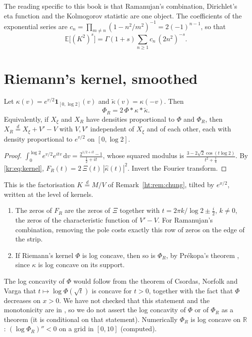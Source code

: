 The reading specific to this book is that Ramanujan's combination, Dirichlet's eta function and the Kolmogorov statistic are one object. The coefficients of the exponential series are $c_n=\prod_{m\ne n}(1-n^2/m^2)^{-1}=2(-1)^{n-1}$, so that
\[
\mathbb E\big[(K^2)^{s}\big]=\Gamma(1+s)\sum_{n\ge1}c_n\,(2n^2)^{-s}.
\]

\section{Riemann's kernel, smoothed}\label{kr:sec:smooth}
\begin{theorem}\label{kr:thm:conv}
Let $\kappa(v)=e^{v/2}\mathbf 1_{[0,\log2]}(v)$ and $\tilde\kappa(v)=\kappa(-v)$. Then
\[
\Phi_R=2\,\Phi*\kappa*\tilde\kappa .
\]
Equivalently, if $X_\xi$ and $X_R$ have densities proportional to $\Phi$ and $\Phi_R$, then $X_R\stackrel d=X_\xi+V'-V$ with $V,V'$ independent of $X_\xi$ and of each other, each with density proportional to $e^{v/2}$ on $[0,\log2]$.
\end{theorem}
\begin{proof}
$\int_0^{\log2}e^{v/2}e^{itv}\,\mathrm dv\allowbreak=\frac{2^{1/2+it}-1}{\frac12+it}$, whose squared modulus is $\frac{3-2\sqrt2\cos(t\log2)}{t^2+\frac14}$. By \eqref{kr:eq:kernel}, $F_R(t)=2\,\Xi(t)\,|\hat\kappa(t)|^2$. Invert the Fourier transform.
\end{proof}
This is the factorisation $K\stackrel d=M/V$ of Remark~\ref{ht:rem:chung}, tilted by $e^{x/2}$, written at the level of kernels.

\begin{corollary}\label{kr:cor:conv}
\begin{enumerate}
\item The zeros of $F_R$ are the zeros of $\Xi$ together with $t=2\pi k/\log2\pm\frac i2$, $k\ne0$, the zeros of the characteristic function of $V'-V$. For Ramanujan's combination, removing the pole costs exactly this row of zeros on the edge of the strip.
\item If Riemann's kernel $\Phi$ is log concave, then so is $\Phi_R$, by Pr\'ekopa's theorem \cite{Prekopa73}, since $\kappa$ is log concave on its support.
\end{enumerate}
\end{corollary}
The log concavity of $\Phi$ would follow from the theorem of Csordas, Norfolk and Varga \cite{CNV86} that $t\mapsto\log\Phi(\sqrt t)$ is concave for $t>0$, together with the fact that $\Phi$ decreases on $x>0$. We have not checked that this statement and the monotonicity are in \cite{CNV86}, so we do not assert the log concavity of $\Phi$ or of $\Phi_R$ as a theorem (it is conditional on that statement). Numerically $\Phi_R$ is log concave on $\mathbb R$: $(\log\Phi_R)''<0$ on a grid in $[0,10]$ (computed).

